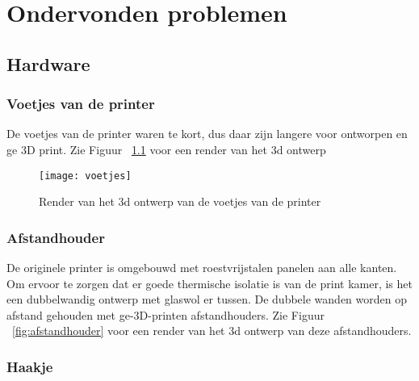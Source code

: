 \chapter{Ondervonden problemen}
\label{Ondervonden_problemen}

\section{Hardware}

\subsection{Voetjes van de printer}

De voetjes van de printer waren te kort, dus daar zijn langere voor
ontworpen en ge 3D print. Zie Figuur ~\ref{fig:voetjes} voor een render van
het 3d ontwerp

\begin{figure}[h]
    \centerline{\texttt{[image: voetjes]}}
    \caption{Render van het 3d ontwerp van de voetjes van de printer}
    \label{fig:voetjes}
\end{figure}

\subsection{Afstandhouder}

De originele printer is omgebouwd met roestvrijstalen panelen aan alle kanten.
Om ervoor te zorgen dat er goede thermische isolatie is van de print kamer, is
het een dubbelwandig ontwerp met glaswol er tussen. De dubbele wanden worden op
afstand gehouden met ge-3D-printen afstandhouders. Zie Figuur
~\ref{fig:afstandhouder} voor een render van het 3d ontwerp van deze
afstandhouders.

\subsection{Haakje}

